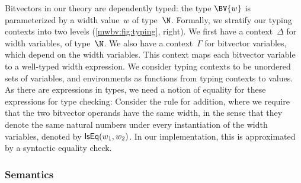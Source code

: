Bitvectors in our theory are dependently typed: the type $\BV{w}$ is
parameterized by a width value~$w$ of type~$\N$.
%
Formally, we stratify our typing contexts into two levels (\cref{mwbv:fig:typing},
right).
%
We first have a context~$\Delta$ for width variables, of type~$\N$.
%
We also have a context~$\Gamma$ for bitvector variables, which depend on the
width variables. This context maps each bitvector variable to a well-typed width
expression. We consider typing contexts to be unordered sets of variables, and
environments as functions from typing contexts to values.
As there are expressions in types, we need a notion of equality for these
expressions for type checking:
Consider the rule for addition, where we require that the two bitvector operands
have the same width, in the sense that they denote the same natural numbers
under every instantiation of the width variables, denoted by $\mathsf{IsEq}(w_1, w_2)$.
%
In our implementation, this is approximated by a syntactic equality check.

\subsubsection{Semantics}
\label{mwbv:sec:semantics}

